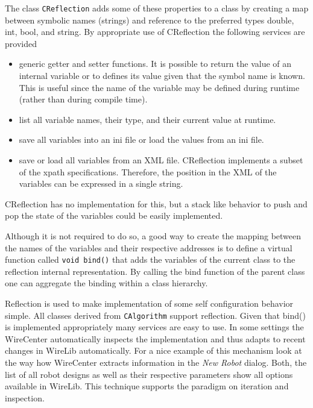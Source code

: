 \documentclass[11pt,a4paper,onepage,openany]{book}
\begin{document}
The class \texttt{CReflection} adds some of these properties to a class by
creating a map between symbolic names (strings) and reference to the preferred
types double, int, bool, and string. By appropriate use of CReflection the
following services are provided

\begin{itemize}
\item generic getter and setter functions. It is possible to return the
    value
    of an internal variable or to defines its value given that the symbol
    name is known. This is useful since the name of the variable may be
    defined during runtime (rather than during compile time).

\item list all variable names, their type, and their current value at
    runtime.

\item save all variables into an ini file or load the values from an ini
    file.

\item save or load all variables from an XML file. CReflection implements a
    subset of the xpath specifications. Therefore, the position in the XML
    of
    the variables can be expressed in a single string.
\end{itemize}

CReflection has no implementation for this, but a stack like behavior to push
and pop the state of the variables could be easily implemented.

Although it is not required to do so, a good way to create the mapping between
the names of the variables and their respective addresses is to define a
virtual function called \texttt{void bind()} that adds the variables of the
current class to the reflection internal representation. By calling the bind
function of the parent class one can aggregate the binding within a class
hierarchy.

Reflection is used to make implementation of some self configuration behavior
simple. All classes derived from \texttt{CAlgorithm} support reflection. Given
that bind() is implemented appropriately many services are easy to use. In some
settings the WireCenter automatically inspects the implementation and thus
adapts to recent changes in WireLib automatically. For a nice example of this
mechanism look at the way how WireCenter extracts information in the \emph{New
Robot} dialog. Both, the list of all robot designs as well as their respective
parameters show all options available in WireLib. This technique supports the
paradigm on iteration and inspection.
\end{document}

